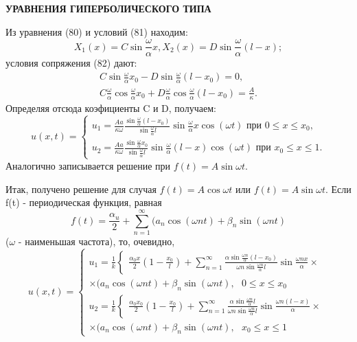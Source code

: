 \documentclass[a4paper, 12pt]{article}
\begin{document}
\begin{center}
{\bf УРАВНЕНИЯ ГИПЕРБОЛИЧЕСКОГО ТИПА}
\end{center}

Из уравнения  (80) и условий  (81) находим:
$$
X_{1}(x) = C \sin\frac{\omega}{\alpha}x, X_{2}(x) = D \sin\frac{\omega}{\alpha}(l-x);
$$
условия сопряжения  (82) дают:
$$
\begin{aligned}
C \sin\frac{\omega}{\alpha}x_{0} - D \sin\frac{\omega}{\alpha}(l-x_{0}) = 0,\\
C\frac{\omega}{\alpha}\cos\frac{\omega}{\alpha}x_{0} + D \frac{\omega}{\alpha}\cos\frac{\omega}{\alpha}(l-x_{0}) =\frac{A}{\kappa}.
\end{aligned}
$$
Определяя отсюда коэфициенты C и D, получаем:
\begin{equation*}
u(x, t) = 
 \begin{cases}
   u_{1} = \frac{Aa}{\kappa\omega}\frac{\sin\frac{\omega}{\alpha}(l-x_{0})}{\sin\frac{\omega}{\alpha}l}\sin\frac{\omega}{\alpha}x\cos(\omega t) \text{ при } 0\leqslant x \leqslant x_{0}, 
   \\
   u_{2} = \frac{Aa}{\kappa\omega}\frac{\sin\frac{\omega}{\alpha}x_{0}}{\sin\frac{\omega}{\alpha}l}\sin\frac{\omega}{\alpha}(l - x)\cos(\omega t) \text{ при } x_{0}\leqslant x \leqslant 1.
 \end{cases}
\end{equation*}
Аналогично записывается решение при  $f(t) = A\sin\omega t$.

Итак, получено решение для случая $f(t) = A\cos\omega t$ или $f(t) = A\sin\omega t$. Если f(t) - периодическая функция, равная
$$
f(t) = \frac{\alpha_{u}}{2} + \sum\limits_{n=1}^{\infty}(a_{n}\cos(\omega n t) + \beta_{n}\sin(\omega n t)
$$
($\omega$ - наименьшая частота), то, очевидно,
\begin{equation*}
u(x, t) = 
 \begin{cases}
u_{1} = \frac{1}{k}
 \begin{cases}
 \frac{\alpha_{0}x}{2}(1 - \frac{x_{0}}{l}) +  \sum\limits_{n=1}^{\infty}\frac{\alpha\sin\frac{\omega n}{\alpha}(l - x_{0})}{\omega n\sin\frac{\omega n}{\alpha}l}\sin\frac{\omega nx}{\alpha}\times
   \end{cases}
   \\
\times(a_{n}\cos(\omega n t) + \beta_{n}\sin(\omega n t),\text{ } 0\leqslant x \leqslant x_{0}
\\
u_{2} = \frac{1}{k}
 \begin{cases}
   \frac{\alpha_{0}x_{0}}{2}(1 - \frac{x_{0}}{l}) +  \sum\limits_{n=1}^{\infty}\frac{\alpha\sin\frac{\omega n}{\alpha}l}{\omega n\sin\frac{\omega n}{\alpha}l}\sin\frac{\omega n(l - x)}{\alpha}\times
 \end{cases}
\\
\times(a_{n}\cos(\omega n t) + \beta_{n}\sin(\omega n t),\text{ } x_{0}\leqslant x \leqslant 1
 \end{cases}
\end{equation*}
\end{document}
